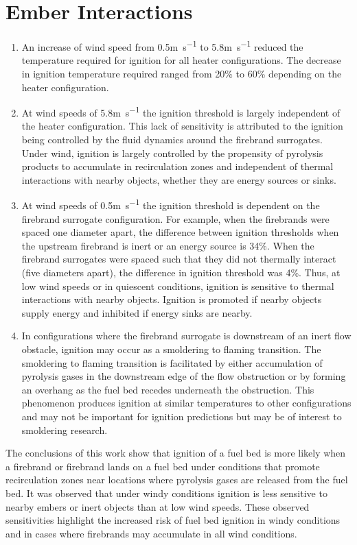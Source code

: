 \section{Ember Interactions}
        \begin{enumerate}
            \item An increase of wind speed from 0.5\si{\meter\per\second} to 5.8\si{\meter\per\second} reduced the temperature required for ignition for all heater configurations. The decrease in ignition temperature required ranged from 20\% to 60\% depending on the heater configuration. 
            
            \item At wind speeds of 5.8\si{\meter\per\second} the ignition threshold is largely independent of the heater configuration. This lack of sensitivity is attributed to the ignition being controlled by the fluid dynamics around the firebrand surrogates. Under wind, ignition is largely controlled by the propensity of pyrolysis products to accumulate in recirculation zones and independent of thermal interactions with nearby objects, whether they are energy sources or sinks. 
            \item At wind speeds of 0.5\si{\meter\per\second} the ignition threshold is dependent on the firebrand surrogate configuration. For example, when the firebrands were spaced one diameter apart, the difference between ignition thresholds when the upstream firebrand is inert or an energy source is 34\%. When the firebrand surrogates were spaced such that they did not thermally interact (five diameters apart), the difference in ignition threshold was 4\%. Thus, at low wind speeds or in quiescent conditions, ignition is sensitive to thermal interactions with nearby objects. Ignition is promoted if nearby objects supply energy and inhibited if energy sinks are nearby. 
            
            \item In configurations where the firebrand surrogate is downstream of an inert flow obstacle, ignition may occur as a smoldering to flaming transition. The smoldering to flaming transition is facilitated by either accumulation of pyrolysis gases in the downstream edge of the flow obstruction or by forming an overhang as the fuel bed recedes underneath the obstruction. This phenomenon produces ignition at similar temperatures to other configurations and may not be important for ignition predictions but may be of interest to smoldering research. 
        \end{enumerate}
    The conclusions of this work show that ignition of a fuel bed is more likely when a firebrand or firebrand lands on a fuel bed under conditions that promote recirculation zones near locations where pyrolysis gases are released from the fuel bed. It was observed that under windy conditions ignition is less sensitive to nearby embers or inert objects than at low wind speeds. These observed sensitivities highlight the increased risk of fuel bed ignition in windy conditions and in cases where firebrands may accumulate in all wind conditions. 

